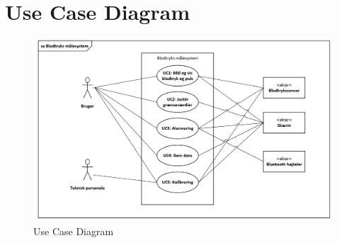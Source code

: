 \section{Use Case Diagram}
\vspace{0.5 cm}
\begin{figure}[h!]
	\centering
	\includegraphics{Kravspecifikation/Diagram}
	\caption{Use Case Diagram}
	\label{fig:Use_case_diagram}
\end{figure}